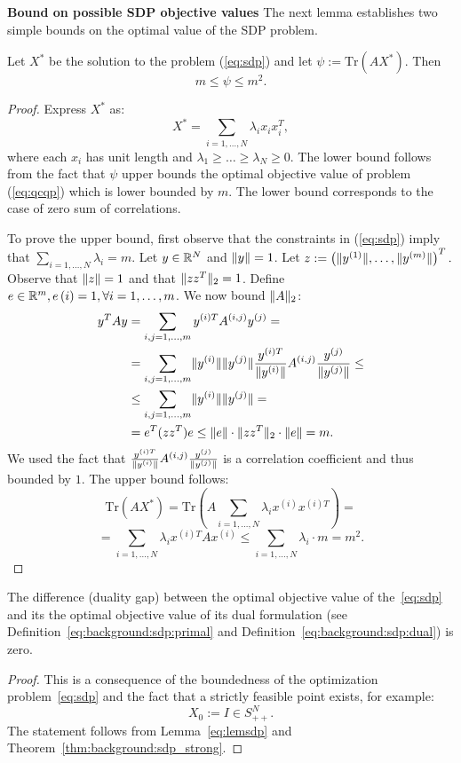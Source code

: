 \noindent\textbf{Bound on possible SDP objective values}
The next lemma establishes two simple bounds on the optimal value of the SDP problem.
\begin{lemma}\label{eq:lemsdp}
Let $X^*$ be the solution to the problem (\ref{eq:sdp}) and let $\psi := \mathrm{Tr}\left(A X^{*}\right)$. Then
$$m \leq \psi \leq m^2.$$
\end{lemma}
\begin{proof}
Express $X^*$ as:
$$X^* =  \underset{i=1,\ldots, N}{\sum} \lambda_i x_i x_i^T,$$
where each $x_i$ has unit length and $\lambda_1 \geq \ldots \geq \lambda_N \geq 0$.
The lower bound follows from the fact that $\psi$ upper bounds the optimal objective
value of problem (\ref{eq:qcqp}) which is lower bounded by $m$. The lower bound corresponds
to the case of zero sum of correlations.

To prove the upper bound, first observe that the constraints in (\ref{eq:sdp})
imply that $\underset{i=1,\ldots, N}{\sum}\lambda_i = m$.
Let $y \in \mathbb{R}^{N}$ and $\lVert y\rVert = 1$.
Let $z := \left(\lVert y^{(1)}\rVert, \ldots, \lVert y^{(m)}\rVert\right)^T.$
Observe that $\lVert z\rVert = 1$ and that $\lVert z z^T\rVert_2 = 1$.
Define $e \in \mathbb{R}^m, e\left(i\right) = 1,  \forall i=1,\ldots,m$.
We now bound $\lVert A\rVert_2$:
\begin{align*}
  y^T A y &= \sum_{i, j = 1,\ldots,m} y^{(i)T} A^{(i,j)} y^{(j)} = \\
& = \sum_{i, j = 1,\ldots,m} \lVert y^{(i)}\rVert \lVert y^{(j)}\rVert \frac{y^{(i)T}}{\lVert y^{(i)}\rVert} A^{(i,j)} \frac{y^{(j)}}{\lVert y^{(j)}\rVert} \leq \\
&\leq \sum_{i, j = 1,\ldots,m} \lVert y^{(i)}\rVert \lVert y^{(j)}\rVert = \\
&= e^T (z z^T) e \leq \lVert e\rVert\cdot \lVert z z^T\rVert_2 \cdot \lVert e\rVert = m.
\end{align*}
We used the fact that $\frac{y^{(i)T}}{\lVert y^{(i)}\rVert} A^{(i,j)} \frac{y^{(j)}}{\lVert y^{(j)}\rVert}$
is a correlation coefficient and thus bounded by $1$.
The upper bound follows:
$$\mathrm{Tr}\left(A X^{*}\right) = \mathrm{Tr}\left(A  \underset{i=1,\ldots, N}{\sum} \lambda_i x^{(i)} x^{(i)T}\right) =$$
$$=  \underset{i=1,\ldots, N}{\sum} \lambda_i x^{(i)T} A x^{(i)} \leq \underset{i=1,\ldots, N}{\sum} \lambda_i \cdot m = m^2.$$
\end{proof}

\begin{corollary}
The difference (duality gap) between the optimal objective value of the~\ref{eq:sdp} and its the optimal objective value of
its dual formulation (see Definition~\ref{eq:background:sdp:primal} and Definition~\ref{eq:background:sdp:dual}) is zero.
\end{corollary}
\begin{proof}
This is a consequence of the boundedness of the optimization problem~\ref{eq:sdp} and the fact that a strictly
feasible point exists, for example: $$X_0 := I \in S_{++}^N.$$
The statement follows from Lemma~\ref{eq:lemsdp} and Theorem~\ref{thm:background:sdp_strong}.
\end{proof}

